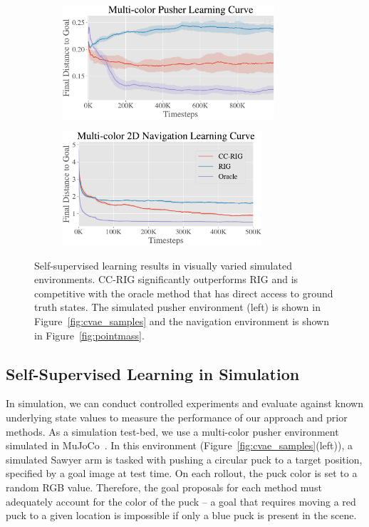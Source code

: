 \begin{figure}[ht!]
    \centering
    \begin{subfigure}[b]{0.48\textwidth}
        \includegraphics[height=4.2cm]{ccrig/img/final_pusher3-crop.pdf}
    \end{subfigure}
    \hspace*{0.3cm}
    \begin{subfigure}[b]{0.48\textwidth}
    \hspace{5mm}
        \includegraphics[height=4.2cm]{ccrig/img/final_pointmass1-crop.pdf}
    \end{subfigure}
    \caption{Self-supervised learning results in visually varied simulated environments. CC-RIG significantly outperforms RIG and is competitive with the oracle method that has direct access to ground truth states. The simulated pusher environment (left) is shown in Figure~\ref{fig:cvae_samples} and the navigation environment is shown in Figure~\ref{fig:pointmass}.}
    \vspace{-0.2in}
    \label{fig:sim-learning-curves}
\end{figure}

\subsection{Self-Supervised Learning in Simulation}

In simulation, we can conduct controlled experiments and evaluate against known underlying state values to measure the performance of our approach and prior methods. As a simulation test-bed, we use a multi-color pusher environment simulated in MuJoCo~\citep{todorov12mujoco}. In this environment (Figure~\ref{fig:cvae_samples}(left)),
a simulated Sawyer arm is tasked with pushing a circular puck to a target position, specified by a goal image at test time. On each rollout, the puck color is set to a random RGB value. Therefore, the goal proposals for each method must adequately account for the color of the puck -- a goal that requires moving a red puck to a given location is impossible if only a blue puck is present in the scene.

